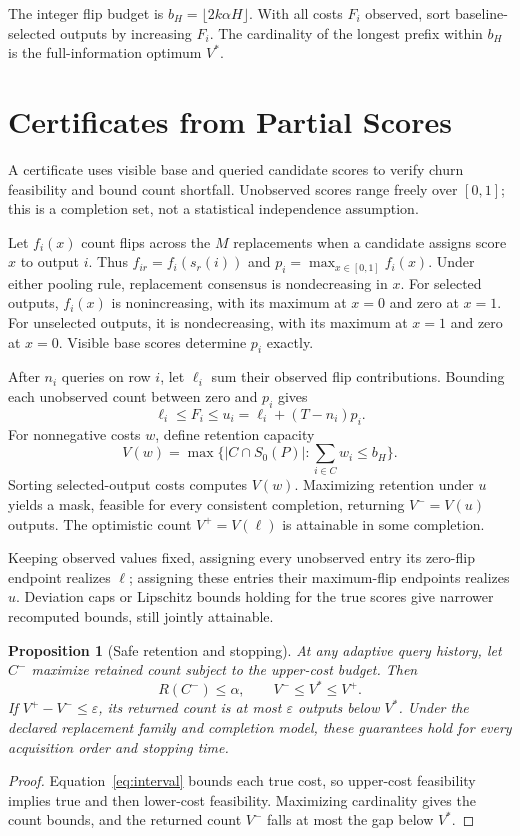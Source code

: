 \documentclass[11pt]{article}
\newtheorem{proposition}{Proposition}
\begin{document}
The integer flip budget is $b_H=\lfloor2k\alpha H\rfloor$. With all costs $F_i$ observed, sort baseline-selected outputs by increasing $F_i$. The cardinality of the longest prefix within $b_H$ is the full-information optimum $V^*$.

\section{Certificates from Partial Scores}
\label{sec:partial}
A certificate uses visible base and queried candidate scores to verify churn feasibility and bound count shortfall. Unobserved scores range freely over $[0,1]$; this is a completion set, not a statistical independence assumption.

Let $f_i(x)$ count flips across the $M$ replacements when a candidate assigns score $x$ to output $i$. Thus $f_{ir}=f_i(s_r(i))$ and $p_i=\max_{x\in[0,1]}f_i(x)$. Under either pooling rule, replacement consensus is nondecreasing in $x$. For selected outputs, $f_i(x)$ is nonincreasing, with its maximum at $x=0$ and zero at $x=1$. For unselected outputs, it is nondecreasing, with its maximum at $x=1$ and zero at $x=0$. Visible base scores determine $p_i$ exactly.

After $n_i$ queries on row $i$, let $\ell_i$ sum their observed flip contributions. Bounding each unobserved count between zero and $p_i$ gives
\begin{equation}
 \ell_i\le F_i\le u_i=\ell_i+(T-n_i)p_i.
 \label{eq:interval}
\end{equation}
For nonnegative costs $w$, define retention capacity
\[
 V(w)=\max\{|C\cap S_0(P)|:\sum_{i\in C}w_i\le b_H\}.
\]
Sorting selected-output costs computes $V(w)$. Maximizing retention under $u$ yields a mask, feasible for every consistent completion, returning $V^-=V(u)$ outputs. The optimistic count $V^+=V(\ell)$ is attainable in some completion.

Keeping observed values fixed, assigning every unobserved entry its zero-flip endpoint realizes $\ell$; assigning these entries their maximum-flip endpoints realizes $u$. Deviation caps or Lipschitz bounds holding for the true scores give narrower recomputed bounds, still jointly attainable.
\begin{proposition}[Safe retention and stopping]
\label{prop:stop}
At any adaptive query history, let $C^-$ maximize retained count subject to the upper-cost budget. Then
\[
 R(C^-)\le\alpha,\qquad V^-\le V^*\le V^+.
\]
If $V^+-V^-\le\varepsilon$, its returned count is at most $\varepsilon$ outputs below $V^*$. Under the declared replacement family and completion model, these guarantees hold for every acquisition order and stopping time.
\end{proposition}
\begin{proof}
Equation~\ref{eq:interval} bounds each true cost, so upper-cost feasibility implies true and then lower-cost feasibility. Maximizing cardinality gives the count bounds, and the returned count $V^-$ falls at most the gap below $V^*$.
\end{proof}
\end{document}
